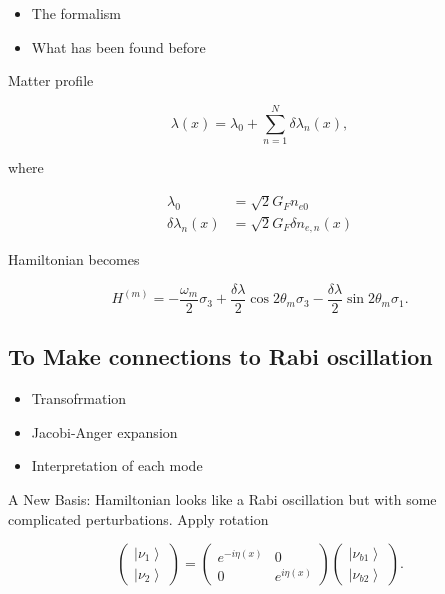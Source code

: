 \documentclass[%
preprint,
 amsmath,amssymb,
 aps,
]{revtex4-1}
\newcommand{\ket}[1]{\left| #1\right\rangle}
\begin{document}
\begin{itemize}
    \item The formalism
    \item What has been found before
\end{itemize}


    Matter profile

\begin{equation}
    \lambda(x) = \lambda_0 + \sum_{n=1}^{N} \delta \lambda_n (x),
\end{equation}

where

\begin{align}
    \lambda_0 &= \sqrt{2}G_F n_{e0} \\
    \delta \lambda_n(x) &= \sqrt{2}G_F \delta n_{e,n}(x)
\end{align}


Hamiltonian becomes

\begin{equation}
    H^{(m)} = - \frac{\omega_m}{2} \sigma_3 + \frac{\delta \lambda}{2} \cos 2\theta_m \sigma_3 - \frac{\delta \lambda}{2} \sin 2 \theta_m \sigma_1.
\end{equation}


\subsection{To Make connections to Rabi oscillation}

\begin{itemize}
    \item Transofrmation
    \item Jacobi-Anger expansion
    \item Interpretation of each mode
\end{itemize}


A New Basis: Hamiltonian looks like a Rabi oscillation but with some complicated perturbations.
    Apply rotation


\begin{equation}
\begin{pmatrix} \ket{\nu_1} \\ \ket{\nu_2} \end{pmatrix} = \begin{pmatrix} e^{-i \eta (x)} & 0 \\  0 & e^{i \eta (x)}  \end{pmatrix} \begin{pmatrix} \ket{\nu_{b1}} \\ \ket{\nu_{b2}} \end{pmatrix}.
\end{equation}
\end{document}
